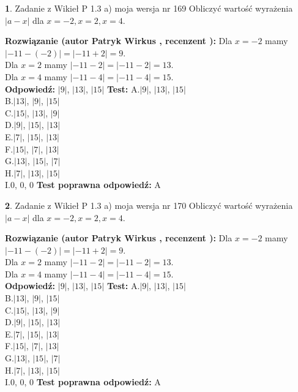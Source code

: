 \documentclass[12pt, a4paper]{article}
\theoremstyle{definition} %
\newtheorem{zad}{}
\newcommand{\zadStart}[1]{\begin{zad}#1\newline}
\newcommand{\zadStop}{\end{zad}}
\newcommand{\rozwStart}[2]{\noindent \textbf{Rozwiązanie (autor #1 , recenzent #2): }\newline}
\newcommand{\rozwStop}{\newline}
\newcommand{\odpStart}{\noindent \textbf{Odpowiedź:}\newline}
\newcommand{\odpStop}{\newline}
\newcommand{\testStart}{\noindent \textbf{Test:}\newline}
\newcommand{\testStop}{\newline}
\newcommand{\kluczStart}{\noindent \textbf{Test poprawna odpowiedź:}\newline}
\newcommand{\kluczStop}{\newline}
\begin{document}
\zadStart{Zadanie z Wikieł P 1.3 a) moja wersja nr 169}
Obliczyć wartość wyrażenia $|a - x|$ dla $x=-2,x=2,x=4$.
\zadStop
\rozwStart{Patryk Wirkus}{}
Dla $x = -2$ mamy $|-11 - (-2)| = |-11 + 2| = 9$.\\
Dla $x = 2$ mamy $|-11 - 2| = |-11 - 2| = 13$.\\
Dla $x = 4$ mamy $|-11 - 4| = |-11 - 4| = 15$.\\
\rozwStop
\odpStart
$|9|$, $|13|$, $|15|$
\odpStop
\testStart
A.$|9|$, $|13|$, $|15|$\\
B.$|13|$, $|9|$, $|15|$\\
C.$|15|$, $|13|$, $|9|$\\
D.$|9|$, $|15|$, $|13|$\\
E.$|7|$, $|15|$, $|13|$\\
F.$|15|$, $|7|$, $|13|$\\
G.$|13|$, $|15|$, $|7|$\\
H.$|7|$, $|13|$, $|15|$\\
I.$0$, $0$, $0$
\testStop
\kluczStart
A
\kluczStop



\zadStart{Zadanie z Wikieł P 1.3 a) moja wersja nr 170}
Obliczyć wartość wyrażenia $|a - x|$ dla $x=-2,x=2,x=4$.
\zadStop
\rozwStart{Patryk Wirkus}{}
Dla $x = -2$ mamy $|-11 - (-2)| = |-11 + 2| = 9$.\\
Dla $x = 2$ mamy $|-11 - 2| = |-11 - 2| = 13$.\\
Dla $x = 4$ mamy $|-11 - 4| = |-11 - 4| = 15$.\\
\rozwStop
\odpStart
$|9|$, $|13|$, $|15|$
\odpStop
\testStart
A.$|9|$, $|13|$, $|15|$\\
B.$|13|$, $|9|$, $|15|$\\
C.$|15|$, $|13|$, $|9|$\\
D.$|9|$, $|15|$, $|13|$\\
E.$|7|$, $|15|$, $|13|$\\
F.$|15|$, $|7|$, $|13|$\\
G.$|13|$, $|15|$, $|7|$\\
H.$|7|$, $|13|$, $|15|$\\
I.$0$, $0$, $0$
\testStop
\kluczStart
A
\kluczStop
\end{document}
